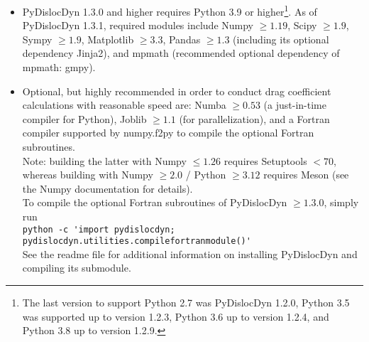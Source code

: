 \documentclass[11pt,letterpaper,oneside,pdftex]{article}
\begin{document}
\begin{itemize}
\item PyDislocDyn 1.3.0 and higher requires Python 3.9 or higher\footnote{
The last version to support Python 2.7 was PyDislocDyn 1.2.0, Python 3.5 was supported up to version 1.2.3, Python 3.6 up to version 1.2.4, and Python 3.8 up to version 1.2.9.}.
As of PyDislocDyn 1.3.1, required modules include Numpy $\ge1.19$, Scipy $\ge1.9$, Sympy $\ge1.9$, Matplotlib $\ge3.3$, Pandas $\ge1.3$ (including its optional dependency Jinja2), and mpmath (recommended optional dependency of mpmath: gmpy).
\item Optional, but highly recommended in order to conduct drag coefficient calculations with reasonable speed are:
Numba $\ge0.53$ (a just-in-time compiler for Python), Joblib $\ge1.1$ (for parallelization), and a Fortran compiler supported by numpy.f2py to compile the optional Fortran subroutines.
\\
Note: building the latter with Numpy $\le1.26$ requires Setuptools $<70$, whereas building with Numpy $\ge2.0$ / Python $\ge3.12$ requires Meson (see the Numpy documentation for details).\\
To compile the optional Fortran subroutines of PyDislocDyn $\ge1.3.0$, simply run\\
 \verb|python -c 'import pydislocdyn; pydislocdyn.utilities.compilefortranmodule()'|\\
See the readme file for additional information on installing PyDislocDyn and compiling its submodule.


\end{itemize}
\end{document}
